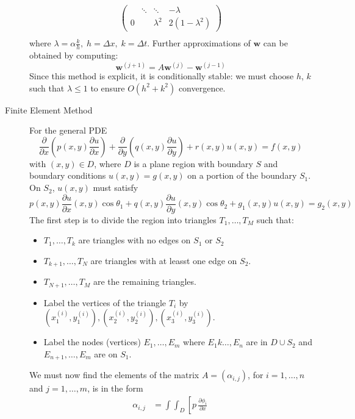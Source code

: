 \documentclass[8pt]{article}
\begin{document}
\begin{multicols}{2}
\begin{description}
\begin{equation*}
\begin{aligned}
\begin{pmatrix}
            & \ddots & \ddots & -\lambda\\
            0 & & \lambda^2 & 2(1-\lambda^2)
          \end{pmatrix} \\
      \end{aligned}
    \end{equation*}
    where $\lambda=\alpha\frac{k}{h},\;h=\Delta x,\;k=\Delta
    t$. Further approximations of $\mathbf{w}$ can be obtained by
    computing:
    $$ \mathbf{w}^{(j+1)} = A \mathbf{w}^{(j)} - \mathbf{w}^{(j-1)}$$
    Since this method is explicit, it is conditionally stable: we must
    choose $h$, $k$ such that $\lambda\leq1$ to ensure $O(h^2+k^2)$
    convergence.
  \item[Finite Element Method] For the general PDE
    $$ \frac{\partial}{\partial x}\left(p(x,y)\frac{\partial u}{\partial x}\right) + 
    \frac{\partial}{\partial y}\left(q(x,y)\frac{\partial u}{\partial y}\right) +
    r(x,y)u(x,y)=f(x,y)$$
    with $(x,y) \in D$, where $D$ is a plane region with boundary $S$
    and boundary conditions $u(x,y)=g(x,y)$ on a portion of the
    boundary $S_1$. On $S_2$, $u(x,y)$ must satisfy 
    $$ p(x,y)\frac{\partial u}{\partial x}(x,y)\cos\theta_1 +
    q(x,y)\frac{\partial u}{\partial y}(x,y)\cos\theta_2 +
    g_1(x,y)u(x,y) = g_2(x,y)$$
    The first step is to divide the region into triangles
    $T_1,\ldots,T_M$ such that:
    \begin{itemize}
    \item $T_1,\ldots,T_k$ are triangles with no edges on $S_1$ or $S_2$
    \item $T_{k+1},\ldots,T_N$ are triangles with at leasst one edge
      on $S_2$.
    \item $T_{N+1},\ldots,T_M$ are the remaining triangles.
    \item Label the vertices of the triangle $T_i$ by
      $(x_1^{(i)},y_1^{(i)}), (x_2^{(i)},y_2^{(i)}), (x_3^{(i)},y_3^{(i)})$.
    \item Label the nodes (vertices) $E_1,\ldots,E_m$ where
      $E_1k\ldots,E_n$ are in $D \cup S_2$ and $E_{n+1},\ldots,E_m$
      are on $S_1$.
    \end{itemize}
    We must now find the elements of the matrix $A = (\alpha_{i,j})$, for
    $i=1,\ldots,n$ and $j=1,\ldots,m$, is in the form
    \begin{equation*}
      \begin{aligned}
        \alpha_{i,j} &=
        \int\int_{D}\left[
          p \,
          \frac{\partial\phi_i}{\partial x} \,

\end{aligned}
\end{equation*}
\end{description}
\end{multicols}
\end{document}

